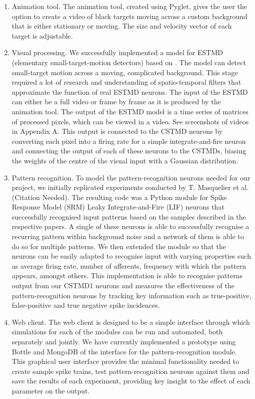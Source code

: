 \documentclass[a4paper,11pt]{article}
\begin{document}
\begin{enumerate}

	\item Animation tool. The animation tool, created using Pyglet, gives the user the option to create a video of black targets moving across a custom background that is either stationary or moving. The size and velocity vector of each target is adjustable.
	\item Visual processing. We successfully implemented a model for ESTMD (elementary small-target-motion detectors) based on \cite{hal11}. The model can detect small-target motion across a moving, complicated background. This stage required a lot of research and understanding of spatio-temporal filters that approximate the function of real ESTMD neurons. The input of the ESTMD can either be a full video or frame by frame as it is produced by the animation tool. The output of the ESTMD model is a time series of matrices of processed pixels, which can be viewed in a video. See screenshots of videos in Appendix A.
This output is connected to the CSTMD neurons by converting each pixel into a firing rate for a simple integrate-and-fire neuron and connecting the output of each of these neurons to the CSTMDs, biasing the weights of the centre of the visual input with a Gaussian distribution.
	\item Pattern recognition. To model the pattern-recognition neurons needed for our project, we initially replicated experiments conducted by T. Masquelier et al. (Citation Needed). The resulting code was a Python module for Spike Response Model (SRM) Leaky Integrate-and-Fire (LIF) neurons that successfully recognised input patterns based on the samples described in the respective papers. A single of these neurons is able to successfully recognise a recurring pattern within background noise and a network of them is able to do so for multiple patterns. We then extended the module so that the neurons can be easily adapted to recognise input with varying properties such as average firing rate, number of afferents, frequency with which the pattern appears, amongst others. This implementation is able to recognise patterns output from our CSTMD1 neurons and measures the effectiveness of the pattern-recognition neurons by tracking key information such as true-positive, false-positive and true negative spike incidences.
	\item Web client. The web client is designed to be a simple interface through which simulations for each of the modules can be run and automated, both separately and jointly. We have currently implemented a prototype using Bottle and MongoDB of the interface for the pattern-recognition module. This graphical user interface provides the minimal functionality needed to create sample spike trains, test pattern-recognition neurons against them and save the results of each experiment, providing key insight to the effect of each parameter on the output.
\end{enumerate}
\end{document}

